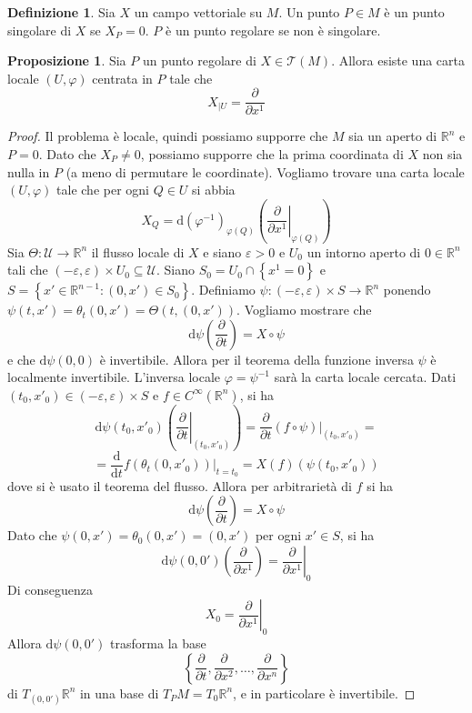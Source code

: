 \documentclass[a4paper,11pt]{article}
\theoremstyle{definition}
\newtheorem{definizione}{Definizione}[section]
\theoremstyle{theorem}
\newtheorem{proposizione}{Proposizione}[section]
\newcommand{\dif}{\mathrm{d}}
\newcommand{\R}{\mathbb{R}}
\begin{document}
\begin{definizione}
	Sia $X$ un campo vettoriale su $M$. Un punto $P\in M$ è un punto singolare di $X$ se $X_P=0$. $P$ è un punto regolare se non è singolare.
\end{definizione}
\begin{proposizione}
	\label{regular}
	Sia $P$ un punto regolare di $X\in\mathcal{T}(M)$. Allora esiste una carta locale $(U,\varphi)$ centrata in $P$ tale che 
	\[X_{|U}=\frac{\partial}{\partial x^1}\]
\end{proposizione}
\begin{proof}
	Il problema è locale, quindi possiamo supporre che $M$ sia un aperto di $\R^n$ e $P=0$. Dato che $X_P\neq0$, possiamo supporre che la prima coordinata di $X$ non sia nulla in $P$ (a meno di permutare le coordinate). Vogliamo trovare una carta locale $(U,\varphi)$ tale che per ogni $Q\in U$ si abbia
	\[X_Q=\dif(\varphi^{-1})_{\varphi(Q)}\left(\left.\frac{\partial}{\partial x^1}\right|_{\varphi(Q)}\right)\]
	Sia $\Theta\colon\mathcal{U}\to\R^n$ il flusso locale di $X$ e siano $\varepsilon>0$ e $U_0$ un intorno aperto di $0\in\R^n$ tali che $(-\varepsilon,\varepsilon)\times U_0\subseteq\mathcal{U}$. Siano $S_0=U_0\cap\left\{x^1=0\right\}$ e  $S=\left\{x'\in\R^{n-1}:(0,x')\in S_0\right\}$. Definiamo $\psi\colon(-\varepsilon,\varepsilon)\times S\to\R^n$ ponendo $\psi(t,x')=\theta_t(0,x')=\Theta(t,(0,x'))$. Vogliamo mostrare che
	\[\dif\psi\left(\frac{\partial}{\partial t}\right)=X\circ\psi\]
	e che $\dif\psi(0,0)$ è invertibile. Allora per il teorema della funzione inversa $\psi$ è localmente invertibile. L'inversa locale $\varphi=\psi^{-1}$ sarà la carta locale cercata. Dati $(t_0,x'_0)\in(-\varepsilon,\varepsilon)\times S$ e $f\in C^\infty(\R^n)$, si ha
	\[\dif\psi(t_0,x'_0)\left(\left.\frac{\partial}{\partial t}\right|_{(t_0,x'_0)}\right)=\frac{\partial}{\partial t}\left.(f\circ\psi)\right|_{(t_0,x'_0)}=\]
	\[=\frac{\dif}{\dif t}\left.f(\theta_t(0,x'_0))\right|_{t=t_0}=X(f)(\psi(t_0,x'_0))\]
	dove si è usato il teorema del flusso. Allora per arbitrarietà di $f$ si ha
	\[\dif\psi\left(\frac{\partial}{\partial t}\right)=X\circ\psi\]
	Dato che $\psi(0,x')=\theta_0(0,x')=(0,x')$ per ogni $x'\in S$, si ha
	\[\dif\psi(0,0')\left(\frac{\partial}{\partial x^1}\right)=\left.\frac{\partial}{\partial x^1}\right|_{0}\]
	Di conseguenza
	\[X_0=\left.\frac{\partial}{\partial x^1}\right|_{0}\]
	Allora $\dif\psi(0,0')$ trasforma la base
	\[\left\{\frac{\partial}{\partial t},\frac{\partial}{\partial x^2},\dots,\frac{\partial}{\partial x^n}\right\}\]
	di $T_{(0,0')}\R^n$ in una base di $T_PM=T_0\R^n$, e in particolare è invertibile.
\end{proof}
\end{document}
